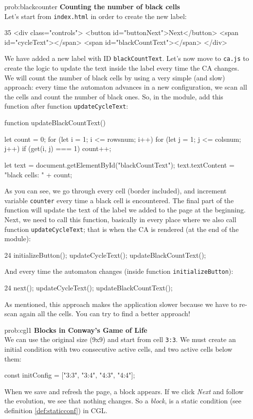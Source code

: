 \begin{sol}{prob:blackcounter}
\textbf{Counting the number of black cells}\\
Let's start from \texttt{index.html} in order to create the new label:
\begin{codehtmlh1}{3}{5}
<div class="controls">
  <button id="buttonNext">Next</button>
  <span id="cycleText"></span>
  <span id="blackCountText"></span>
</div>
\end{codehtmlh1}
We have added a new label with ID \texttt{blackCountText}. Let's now move to \texttt{ca.js} to create the logic to
update the text inside the label every time the CA changes. We will count the number of black cells by using a
very simple (and slow) approach: every time the automaton advances in a new configuration, we scan all the cells and
count the number of black ones. So, in the module, add this function after function \texttt{updateCycleText}:
\begin{code}
function updateBlackCountText() {
  let count = 0;
  for (let i = 1; i <= rowsnum; i++) {
    for (let j = 1; j <= colsnum; j++) {
      if (get(i, j) === 1) {
          count++;
      }
    }
  }

  let text = document.getElementById("blackCountText");
  text.textContent = "black cells: " + count;
}
\end{code}
As you can see, we go through every cell (border included), and increment variable \texttt{counter} every time
a black cell is encountered. The final part of the function will update the text of the label we added to the
page at the beginning.
Next, we need to call this function, basically in every place where we also call function \texttt{updateCycleText};
that is when the CA is rendered (at the end of the module):
\begin{codeh1}{2}{4}
initializeButton();
updateCycleText();
updateBlackCountText();
\end{codeh1}
And every time the automaton changes (inside function \texttt{initializeButton}):
\begin{codeh1}{2}{4}
next();
updateCycleText();
updateBlackCountText();
\end{codeh1}
As mentioned, this approach makes the application slower because we have to re-scan again all the cells.
You can try to find a better approach!
\end{sol}

\begin{sol}{prob:cgl1}
\textbf{Blocks in Conway's Game of Life}\\
We can use the original size (9x9) and start from cell \texttt{3:3}. We must create
an initial condition with two consecutive active cells, and two active cells below them:
\begin{code}
const initConfig = ["3:3", "3:4", "4:3", "4:4"];
\end{code}
When we save and refresh the page, a block appears. If we click \textit{Next} and follow the
evolution, we see that nothing changes. So a \textit{block}, is a static condition
(see definition \ref{def:staticconf}) in CGL.
\end{sol}


